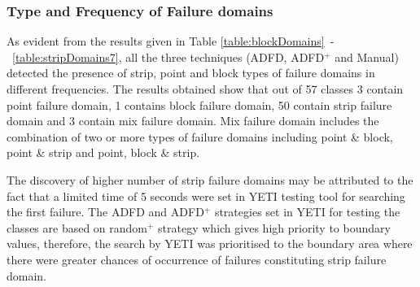 







\subsubsection{Type and Frequency of Failure domains}

As evident from the results given in Table \ref{table:blockDomains}~-~\ref{table:stripDomains7}, all the three techniques (ADFD, ADFD$^+$ and Manual) detected the presence of strip, point and block types of failure domains in different frequencies. The results obtained show that out of 57 classes 3 contain point failure domain, 1 contains block failure domain, 50 contain strip failure domain and 3 contain mix failure domain. Mix failure domain includes the combination of two or more types of failure domains including point \& block, point \& strip and point, block \& strip.


The discovery of higher number of strip failure domains may be attributed to the fact that a limited time of 5 seconds were set in YETI testing tool for searching the first failure. The ADFD and ADFD$^+$ strategies set in YETI for testing the classes are based on random$^+$ strategy which gives high priority to boundary values, therefore, the search by YETI was prioritised to the boundary area where there were greater chances of occurrence of failures constituting strip failure domain.

